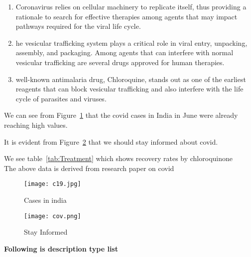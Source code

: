 \documentclass{article}
\begin{document}
\begin{enumerate}

\item Coronavirus relies on cellular machinery to replicate itself, thus providing a rationale to search for effective therapies among agents that may impact pathways required for the viral life cycle.

\item he vesicular trafficking system plays a critical role in viral entry, unpacking, assembly, and packaging. Among agents that can interfere with normal vesicular trafficking are several drugs approved for human therapies.

\item well-known antimalaria drug, Chloroquine, stands out as one of the earliest reagents that can block vesicular trafficking and also interfere with the life cycle of parasites and viruses.
	
\end{enumerate}
\par{We can see from Figure~\ref{gra:cases} that the covid cases in India in June were already reaching high values.}%
\vspace{4mm}

\par{It is evident from Figure~\ref{gra:inform} that we should stay informed about covid.}%
\vspace{4mm}

\par{We see table~\ref{tab:Treatment} which shows recovery rates by chloroquinone\\ The above data is derived from research paper on covid \cite{huang2020treating}}%
\newpage
\begin{figure}
\begin{center}
\texttt{[image: c19.jpg]}  %
\caption{Cases in india} %
\label{gra:cases} %
\end{center}
\end{figure}

\begin{figure}
\begin{center}
\texttt{[image: cov.png]} %
\caption{Stay Informed}%
\label{gra:inform} %
\end{center}
\end{figure}
\textbf{Following is description type list}
\end{document}
